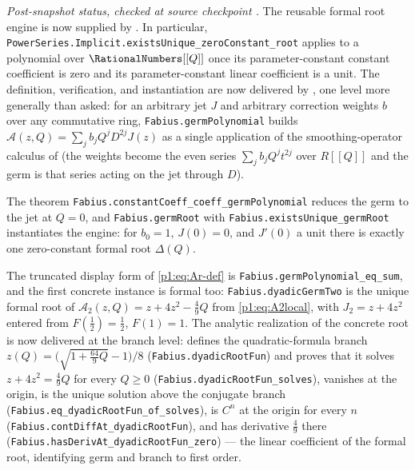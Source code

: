 \documentclass[11pt,oneside]{article}
\numberwithin{equation}{section}
\theoremstyle{definition}
\theoremstyle{remark}
\begin{document}
\begin{obligation}
\emph{Post-snapshot status, checked at source checkpoint
.}
The reusable formal root engine is now supplied by
.  In particular,
\nolinkurl{PowerSeries.Implicit.existsUnique_zeroConstant_root} applies to a
polynomial over $\RationalNumbers[[Q]]$ once its parameter-constant
constant coefficient is zero and its parameter-constant linear coefficient is
a unit.  The definition, verification, and instantiation are now
delivered by , one level more generally than asked:
for an arbitrary jet $J$ and arbitrary correction weights $b$ over any commutative
ring, \nolinkurl{Fabius.germPolynomial} builds $\mathcal A(z,Q)=\sum_j b_jQ^jD^{2j}J(z)$
as a single application of the smoothing-operator calculus of
 (the weights become the even series
$\sum_j b_jQ^jt^{2j}$ over $R[[Q]]$ and the germ is that series acting on the jet
through $D$).
\par\smallskip
\noindent\begin{minipage}{\linewidth}
The theorem \nolinkurl{Fabius.constantCoeff_coeff_germPolynomial} reduces the
germ to the jet at $Q=0$, and \nolinkurl{Fabius.germRoot} with
\nolinkurl{Fabius.existsUnique_germRoot} instantiates the engine: for $b_0=1$,
$J(0)=0$, and $J'(0)$ a unit there is exactly one zero-constant formal root
$\Delta(Q)$.
\end{minipage}
\par\smallskip
The truncated display form of
\eqref{p1:eq:Ar-def} is \nolinkurl{Fabius.germPolynomial\_eq\_sum}, and the first concrete
instance is formal too: \nolinkurl{Fabius.dyadicGermTwo} is the unique formal root of
$\mathcal A_2(z,Q)=z+4z^2-\tfrac49Q$ from \eqref{p1:eq:A2local}, with $J_2=z+4z^2$ entered
from $F(\tfrac12)=\tfrac12$, $F(1)=1$.  The analytic realization of the concrete
root is now delivered at the branch level: 
defines the quadratic-formula branch \(z(Q)=\bigl(\sqrt{1+\tfrac{64}{9}Q}-1\bigr)/8\)
(\nolinkurl{Fabius.dyadicRootFun}) and proves that it solves $z+4z^2=\tfrac49Q$ for every
$Q\ge0$ (\nolinkurl{Fabius.dyadicRootFun\_solves}), vanishes at the origin, is the unique
solution above the conjugate branch (\nolinkurl{Fabius.eq\_dyadicRootFun\_of\_solves}),
is $C^n$ at the origin for every $n$ (\nolinkurl{Fabius.contDiffAt\_dyadicRootFun}), and
has derivative $\tfrac49$ there (\nolinkurl{Fabius.hasDerivAt\_dyadicRootFun\_zero}) --- the
linear coefficient of the formal root, identifying germ and branch to first order.

\end{obligation}
\end{document}
